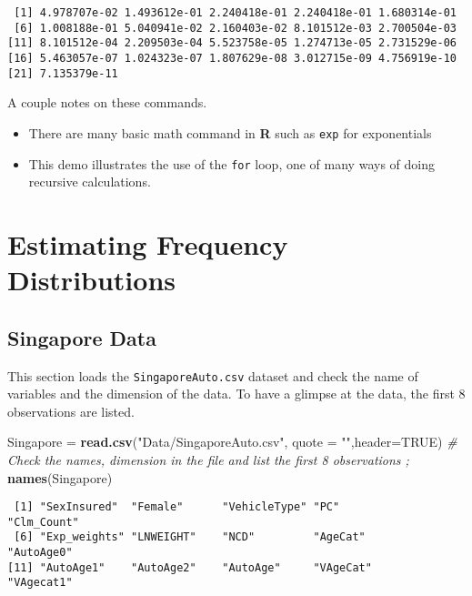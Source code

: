 \documentclass[]{book}
\newenvironment{Shaded}{\begin{snugshade}}{\end{snugshade}}
\newcommand{\KeywordTok}[1]{\textcolor[rgb]{0.13,0.29,0.53}{\textbf{#1}}}
\newcommand{\DataTypeTok}[1]{\textcolor[rgb]{0.13,0.29,0.53}{#1}}
\newcommand{\StringTok}[1]{\textcolor[rgb]{0.31,0.60,0.02}{#1}}
\newcommand{\CommentTok}[1]{\textcolor[rgb]{0.56,0.35,0.01}{\textit{#1}}}
\newcommand{\OtherTok}[1]{\textcolor[rgb]{0.56,0.35,0.01}{#1}}
\newcommand{\NormalTok}[1]{#1}
\providecommand{\tightlist}{%
  \setlength{\itemsep}{0pt}\setlength{\parskip}{0pt}}
\theoremstyle{definition}
\theoremstyle{definition}
\theoremstyle{definition}
\theoremstyle{remark}
\begin{document}
\begin{verbatim}
 [1] 4.978707e-02 1.493612e-01 2.240418e-01 2.240418e-01 1.680314e-01
 [6] 1.008188e-01 5.040941e-02 2.160403e-02 8.101512e-03 2.700504e-03
[11] 8.101512e-04 2.209503e-04 5.523758e-05 1.274713e-05 2.731529e-06
[16] 5.463057e-07 1.024323e-07 1.807629e-08 3.012715e-09 4.756919e-10
[21] 7.135379e-11
\end{verbatim}

A couple notes on these commands.

\begin{itemize}
\tightlist
\item
  There are many basic math command in \textbf{R} such as \texttt{exp}
  for exponentials
\item
  This demo illustrates the use of the \texttt{for} loop, one of many
  ways of doing recursive calculations.
\end{itemize}

\section{Estimating Frequency
Distributions}\label{estimating-frequency-distributions}

\subsection{Singapore Data}\label{singapore-data}

This section loads the \texttt{SingaporeAuto.csv} dataset and check the
name of variables and the dimension of the data. To have a glimpse at
the data, the first 8 observations are listed.

\begin{Shaded}
\begin{Highlighting}[]
\NormalTok{Singapore =}\StringTok{ }\KeywordTok{read.csv}\NormalTok{(}\StringTok{"Data/SingaporeAuto.csv"}\NormalTok{,  }\DataTypeTok{quote =} \StringTok{""}\NormalTok{,}\DataTypeTok{header=}\OtherTok{TRUE}\NormalTok{)}
\CommentTok{#  Check the names, dimension in the file and list the first 8 observations ;}
\KeywordTok{names}\NormalTok{(Singapore)}
\end{Highlighting}
\end{Shaded}

\begin{verbatim}
 [1] "SexInsured"  "Female"      "VehicleType" "PC"          "Clm_Count"  
 [6] "Exp_weights" "LNWEIGHT"    "NCD"         "AgeCat"      "AutoAge0"   
[11] "AutoAge1"    "AutoAge2"    "AutoAge"     "VAgeCat"     "VAgecat1"   
\end{verbatim}
\end{document}
